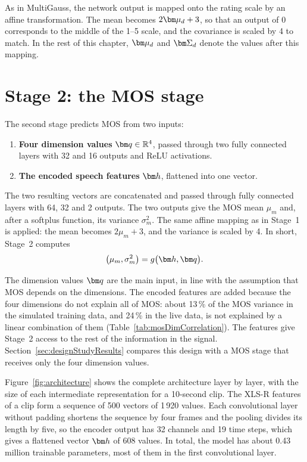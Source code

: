 \documentclass[
english,                 %
bibtex,                  %
includeExtraAbstracts, %
]{kththesis}
\numberwithin{listing}{chapter}
\begin{document}
As in MultiGauss, the network output is mapped onto the rating scale by an affine transformation. The mean becomes $2\vect{\mu}_d + 3$, so that an output of 0 corresponds to the middle of the 1--5 scale, and the covariance is scaled by 4 to match. In the rest of this chapter, $\vect{\mu}_d$ and $\vect{\Sigma}_d$ denote the values after this mapping.

\section{Stage 2: the MOS stage}
\label{sec:mosStage}

The second stage predicts MOS from two inputs:
\begin{enumerate}
\item \textbf{Four dimension values} $\vect{q} \in \mathbb{R}^4$, passed through two fully connected layers with 32 and 16 outputs and ReLU activations.
\item \textbf{The encoded speech features} $\vect{h}$, flattened into one vector.
\end{enumerate}
The two resulting vectors are concatenated and passed through fully connected layers with 64, 32 and 2 outputs. The two outputs give the MOS mean $\mu_m$ and, after a softplus function, its variance $\sigma_m^2$. The same affine mapping as in Stage~1 is applied: the mean becomes $2\mu_m + 3$, and the variance is scaled by 4. In short, Stage~2 computes
\begin{equation}
  \big(\mu_m, \sigma_m^2\big) = g\big(\vect{h}, \vect{q}\big).
  \label{eq:mosStage}
\end{equation}

The dimension values $\vect{q}$ are the main input, in line with the assumption that MOS depends on the dimensions. The encoded features are added because the four dimensions do not explain all of MOS: about 13\,\% of the MOS variance in the simulated training data, and 24\,\% in the live data, is not explained by a linear combination of them (Table~\ref{tab:mosDimCorrelation}). The features give Stage~2 access to the rest of the information in the signal. Section~\ref{sec:designStudyResults} compares this design with a MOS stage that receives only the four dimension values.

Figure~\ref{fig:architecture} shows the complete architecture layer by layer, with the size of each intermediate representation for a 10-second clip. The XLS-R features of a clip form a sequence of 500 vectors of 1\,920 values. Each convolutional layer without padding shortens the sequence by four frames and the pooling divides its length by five, so the encoder output has 32 channels and 19 time steps, which gives a flattened vector $\vect{h}$ of 608 values. In total, the model has about 0.43 million trainable parameters, most of them in the first convolutional layer.
\end{document}
